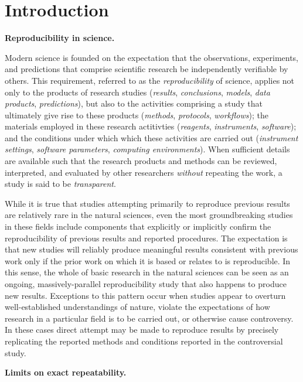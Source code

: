 \section{Introduction}

\textbf{Reproducibility in science.}

Modern science is founded on the expectation that the observations, experiments, and
	predictions that comprise scientific research be independently verifiable by others.
This requirement, referred to as the \emph{reproducibility} of 
	science, applies not only to the products of research studies (\emph{results}, 
	\emph{conclusions}, \emph{models}, \emph{data products}, \emph{predictions}), but also to the 
	activities comprising a study that ultimately give rise to these products (\emph{methods}, 
	\emph{protocols}, \emph{workflows}); the materials employed in these 
	research actitivties (\emph{reagents}, \emph{instruments}, \emph{software}); and the conditions 
	under which which these activities are carried out (\emph{instrument settings}, \emph{software parameters},
	\emph{computing environments}).  When sufficient details are available
	such that the research products and methods can be reviewed, interpreted, and
	evaluated by other researchers \emph{without} repeating the work, a study is said to be 
	\emph{transparent}.

While it is true that studies attempting primarily to reproduce previous results are relatively rare in the
	natural sciences, even the most groundbreaking studies in these fields include components	
	that explicitly or implicitly confirm the reproducibility of previous results and reported procedures.
The expectation is that new studies will reliably produce meaningful results consistent with previous work 
	only if the prior work on which it is based or relates to is reproducible.
In this sense, the whole of basic research in the natural sciences can be seen as an ongoing, massively-parallel
	reproducibility study that also happens to produce new results.
Exceptions to this pattern occur when studies appear to overturn well-established understandings of nature,
	violate the expectations of how research in a particular field is to be carried out, or otherwise cause controversy.
In these cases direct attempt may be made to reproduce results by precisely replicating the reported methods
	and conditions reported in the controversial study.


\textbf{Limits on exact repeatability.}

